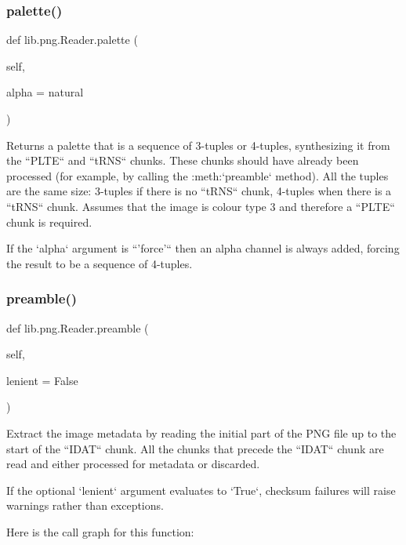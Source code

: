 \subsubsection{\texorpdfstring{palette()}{palette()}}
{\footnotesize\ttfamily def lib.\+png.\+Reader.\+palette (\begin{DoxyParamCaption}\item[{}]{self,  }\item[{}]{alpha = {\ttfamily \textquotesingle{}natural\textquotesingle{}} }\end{DoxyParamCaption})}

\begin{DoxyVerb}Returns a palette that is a sequence of 3-tuples or 4-tuples,
synthesizing it from the ``PLTE`` and ``tRNS`` chunks.  These
chunks should have already been processed (for example, by
calling the :meth:`preamble` method).  All the tuples are the
same size: 3-tuples if there is no ``tRNS`` chunk, 4-tuples when
there is a ``tRNS`` chunk.  Assumes that the image is colour type
3 and therefore a ``PLTE`` chunk is required.

If the `alpha` argument is ``'force'`` then an alpha channel is
always added, forcing the result to be a sequence of 4-tuples.
\end{DoxyVerb}
 \mbox{\label{classlib_1_1png_1_1_reader_a9633656b8407495c98265f78ef92ad10}} 
\subsubsection{\texorpdfstring{preamble()}{preamble()}}
{\footnotesize\ttfamily def lib.\+png.\+Reader.\+preamble (\begin{DoxyParamCaption}\item[{}]{self,  }\item[{}]{lenient = {\ttfamily False} }\end{DoxyParamCaption})}

\begin{DoxyVerb}Extract the image metadata by reading the initial part of
the PNG file up to the start of the ``IDAT`` chunk.  All the
chunks that precede the ``IDAT`` chunk are read and either
processed for metadata or discarded.

If the optional `lenient` argument evaluates to `True`, checksum
failures will raise warnings rather than exceptions.
\end{DoxyVerb}
 Here is the call graph for this function\+:
\mbox{\label{classlib_1_1png_1_1_reader_a26bf1df6ac7fca542b8dc0d035009ce8}} 
